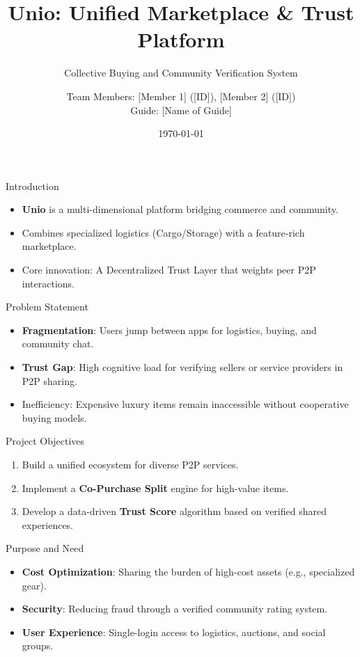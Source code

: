 \documentclass[10pt]{beamer}
\title{Unio: Unified Marketplace \& Trust Platform}
\subtitle{Collective Buying and Community Verification System}
\author{Team Members: [Member 1] ([ID]), [Member 2] ([ID]) \\ Guide: [Name of Guide]}
\date{\today}
\institute{[University Name]}
\begin{document}
\maketitle

\begin{frame}{Introduction}
    \begin{itemize}
        \item \textbf{Unio} is a multi-dimensional platform bridging commerce and community.
        \item Combines specialized logistics (Cargo/Storage) with a feature-rich marketplace.
        \item Core innovation: A \alert{Decentralized Trust Layer} that weights peer P2P interactions.
    \end{itemize}
\end{frame}

\begin{frame}{Problem Statement}
    \begin{itemize}
        \item \textbf{Fragmentation}: Users jump between apps for logistics, buying, and community chat.
        \item \textbf{Trust Gap}: High cognitive load for verifying sellers or service providers in P2P sharing.
        \item \alert{Inefficiency}: Expensive luxury items remain inaccessible without cooperative buying models.
    \end{itemize}
\end{frame}

\begin{frame}{Project Objectives}
    \begin{enumerate}
        \item Build a unified ecosystem for diverse P2P services.
        \item Implement a \textbf{Co-Purchase Split} engine for high-value items.
        \item Develop a data-driven \textbf{Trust Score} algorithm based on verified shared experiences.
    \end{enumerate}
\end{frame}

\begin{frame}{Purpose and Need}
    \begin{itemize}
        \item \textbf{Cost Optimization}: Sharing the burden of high-cost assets (e.g., specialized gear).
        \item \textbf{Security}: Reducing fraud through a verified community rating system.
        \item \textbf{User Experience}: Single-login access to logistics, auctions, and social groups.
    \end{itemize}
\end{frame}
\end{document}
